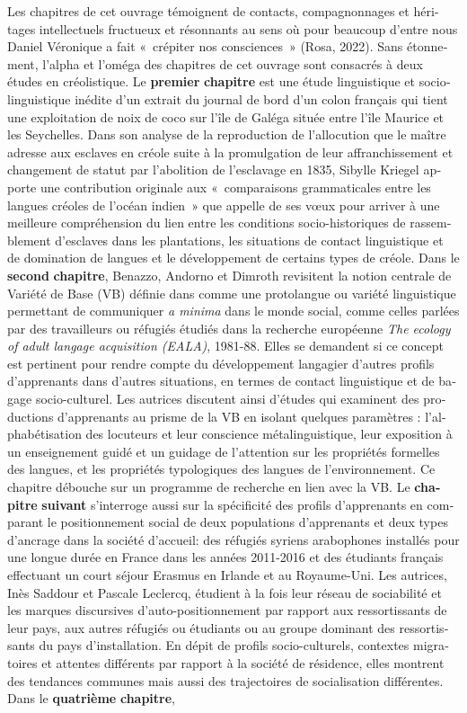 \documentclass[output=paper]{langscibook}
\begin{document}
\begin{otherlanguage}{french}
Les chapitres de cet ouvrage témoignent de contacts, compagnonnages et héritages intellectuels fructueux et résonnants au sens où pour beaucoup d’entre nous Daniel Véronique a fait «~crépiter nos consciences~» (Rosa, 2022). Sans étonnement, l’alpha et l’oméga des chapitres de cet ouvrage sont consacrés à deux études en créolistique. Le {\textbf{premier} \textbf{chapitre}} est une étude linguistique et sociolinguistique inédite d’un extrait du journal de bord d’un colon français qui tient une exploitation de noix de coco sur l’île de Galéga située entre l’île Maurice et les Seychelles. Dans son analyse de la reproduction de l’allocution que le maître adresse aux esclaves en créole suite à la promulgation de leur affranchissement et changement de statut par l’abolition de l’esclavage en 1835, Sibylle Kriegel apporte une contribution originale aux «~comparaisons grammaticales entre les langues créoles de l’océan indien~» que \citet{Véronique2021Pour} appelle de ses vœux pour arriver à une meilleure compréhension du lien entre les conditions socio-historiques de rassemblement d’esclaves dans les plantations, les situations de contact linguistique et de domination de langues et le développement de certains types de créole. Dans le {\textbf{second} \textbf{chapitre}}, Benazzo, Andorno et Dimroth revisitent la notion centrale de Variété de Base (VB) définie dans \citet{KleinPerdue1997} comme une protolangue ou variété linguistique permettant de communiquer {\textit{a minima}} dans le monde social, comme celles parlées par des travailleurs ou réfugiés étudiés dans la recherche européenne {\textit{The ecology of adult langage acquisition (EALA)}}, 1981-88. Elles se demandent si ce concept est pertinent pour rendre compte du développement langagier d’autres profils d’apprenants dans d’autres situations, en termes de contact linguistique et de bagage socio-culturel. Les autrices discutent ainsi d’études qui examinent des productions d’apprenants au prisme de la VB en isolant quelques paramètres : l’alphabétisation des locuteurs et leur conscience métalinguistique, leur exposition à un enseignement guidé et un guidage de l’attention sur les propriétés formelles des langues, et les propriétés typologiques des langues de l’environnement. Ce chapitre débouche sur un programme de recherche en lien avec la VB. Le {\textbf{chapitre} \textbf{suivant}} s’interroge aussi sur la spécificité des profils d’apprenants en comparant le positionnement social de deux populations d’apprenants et deux types d’ancrage dans la société d’accueil: des réfugiés syriens arabophones installés pour une longue durée en France dans les années 2011-2016 et des étudiants français effectuant un court séjour Erasmus en Irlande et au Royaume-Uni. Les autrices, Inès Saddour et Pascale Leclercq, étudient à la fois leur réseau de sociabilité et les marques discursives d’auto-positionnement par rapport aux ressortissants de leur pays, aux autres réfugiés ou étudiants ou au groupe dominant des ressortissants du pays d’installation. En dépit de profils socio-culturels, contextes migratoires et attentes différents par rapport à la société de résidence, elles montrent des tendances communes mais aussi des trajectoires de socialisation différentes. Dans le {\textbf{quatrième} \textbf{chapitre}}, 
\end{otherlanguage}
\end{document}
